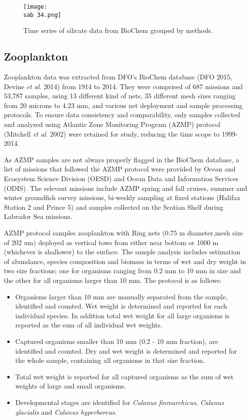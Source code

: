 \documentclass[letterpaper,portrait,11pt]{scrartcl}
\numberwithin{equation}{section}		%
\numberwithin{figure}{section}		%
\numberwithin{table}{section}				%
\newcommand{\ecomod}{\string~/ecomod_data/}   %
\newcommand{\sab}{\ecomod/mpa/sab/}   %
\begin{document}
\begin{appendices}
\begin{figure}[h]

  \centering
  \texttt{[image: \\sab 34.png]}
  \caption{Time series of silicate data from BioChem grouped by methods.}
    \label{fig:silicateTimeseries}
\end{figure}


\clearpage
\subsection{Zooplankton}

Zooplankton data was extracted from DFO's BioChem database (DFO 2015, Devine \textit{et al}. 2014) from 1914 to 2014. They were comprised of 687 missions and 53,787 samples, using 13 different kind of nets, 35 different mesh sizes ranging from 20 microns to 4.23 mm, and various net deployment and sample processing protocols.
To ensure data consistency and comparability, only samples collected and analyzed using Atlantic Zone Monitoring Program (AZMP) protocol (Mitchell \textit{et al}. 2002) were retained for study, reducing the time scope to 1999-2014. 

As AZMP samples are not always properly flagged in the BioChem database, a list of missions that followed the AZMP protocol were provided by Ocean and Ecosystem Science Division (OESD) and Ocean Data and Information Services (ODIS). The relevant missions include AZMP spring and fall cruises, summer and winter groundfish survey missions, bi-weekly sampling at fixed stations (Halifax Station 2 and Prince 5) and samples collected on the Scotian Shelf during Labrador Sea missions. 

AZMP protocol samples zooplankton with Ring nets (0.75 m diameter,mesh size of 202 um) deployed as vertical tows from either near bottom or 1000 m (whichever is shallower) to the surface. The sample analysis includes estimation of abundance, species composition and biomass in terms of wet and dry weight in two size fractions; one for organisms ranging from 0.2 mm to 10 mm in size and the other for all organisms larger than 10 mm.  The protocol is as follows:

\begin{itemize}
  \item Organisms larger than 10 mm are manually separated from the sample, identified and counted. Wet weight is determined and reported for each individual species. In addition total wet weight for all large organisms is reported as the sum of all individual wet weights.
  \item Captured organisms smaller than 10 mm (0.2 - 10 mm fraction), are identified and counted. Dry and wet weight is determined and reported for the whole sample, containing all organisms in that size fraction.
  \item Total wet weight is reported for all captured organisms as the sum of wet weights of large and small organisms.
  \item Developmental stages are identified for \textit{Calanus finmarchicus}, \textit{Calanus glacialis} and \textit{Calanus hyperboreus}. 
\end{itemize}



\end{appendices}
\end{document}
